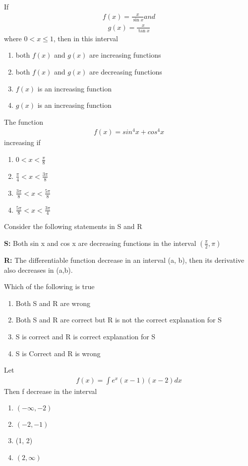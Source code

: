 \item If 
\begin{align*} 
f(x) = \frac{x}{\sin x} 
and 
\end{align*} 
\begin{align*}
g(x) = \frac{x}{\tan x}
\end{align*} 
where $0 < x \leq 1$, then in this interval
\begin{enumerate}
\item both $f(x)$ and $g(x)$ are increasing functions
\item both $f(x)$ and $g(x)$ are decreasing functions
\item $f(x)$ is an increasing function
\item $g(x)$ is an increasing function
\end{enumerate}

\item The function 
\begin{align*} 
f(x) = sin^4 x + cos^4x 
\end{align*} 
increasing if
\begin{enumerate}
\item $0 < x < \frac{\pi}{8}$
\item $\frac{\pi}{4} < x < \frac{3\pi}{8}$
\item $\frac{3\pi}{8} < x < \frac{5\pi}{8}$
\item $\frac{5\pi}{8} < x < \frac{3\pi}{4}$
\end{enumerate}

\item Consider the following statements in S and R

\textbf{S:} Both sin x and cos x are decreasing functions in the interval $(\frac{\pi}{2}, \pi)$

\textbf{R:} The differentiable function decrease in an interval (a, b), then its derivative also decreases in (a,b).

Which of the following is true
\begin{enumerate}
\item Both S and R are wrong
\item Both S and R are correct but R is not the correct explanation for S
\item S is correct and R is correct explanation for S 
\item S is Correct and R is wrong
\end{enumerate}

\item Let 
\begin{align*}
f(x) = \int e^x (x - 1)(x - 2)dx
\end{align*}
Then f decrease in the interval
\begin{enumerate}
\item $(-\infty, -2)$
\item $(-2, -1)$
\item (1, 2)
\item $(2, \infty)$
\end{enumerate}

